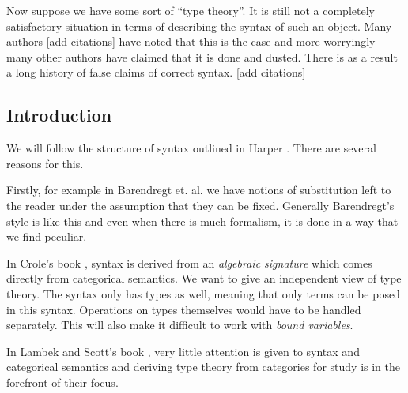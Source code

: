 Now suppose we have some sort of ``type theory''. It is still not a completely satisfactory situation in terms of describing the syntax of such an object. Many authors [add citations] have noted that this is the case and more worryingly many other authors have claimed that it is done and dusted. There is as a result a long history of false claims of correct syntax. [add citations] 

\subsection{Introduction}





We will follow the structure of syntax outlined in Harper \cite{harper_2016}. There are several reasons for this. 

Firstly, for example in Barendregt et. al. \cite{BarendregtHenk2013Lcwt} we have notions of substitution left to the reader under the assumption that they can be fixed. Generally Barendregt's style is like this and even when there is much formalism, it is done in a way that we find peculiar.

In Crole's book \cite{CroleRoyL1993Cft}, syntax is derived from an \textit{algebraic signature} which comes directly from categorical semantics. We want to give an independent view of type theory. The syntax only has types as well, meaning that only terms can be posed in this syntax. Operations on types themselves would have to be handled separately. This will also make it difficult to work with \textit{bound variables}.

In Lambek and Scott's book \cite{LambekJ1986Itho}, very little attention is given to syntax and categorical semantics and deriving type theory from categories for study is in the forefront of their focus.

